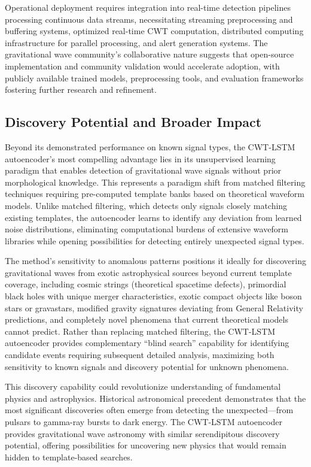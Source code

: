 \documentclass{iopjournal}
\begin{document}
Operational deployment requires integration into real-time detection pipelines processing continuous data streams, necessitating streaming preprocessing and buffering systems, optimized real-time CWT computation, distributed computing infrastructure for parallel processing, and alert generation systems. The gravitational wave community's collaborative nature suggests that open-source implementation and community validation would accelerate adoption, with publicly available trained models, preprocessing tools, and evaluation frameworks fostering further research and refinement.

\subsection{Discovery Potential and Broader Impact}

Beyond its demonstrated performance on known signal types, the CWT-LSTM autoencoder's most compelling advantage lies in its unsupervised learning paradigm that enables detection of gravitational wave signals without prior morphological knowledge. This represents a paradigm shift from matched filtering techniques requiring pre-computed template banks based on theoretical waveform models. Unlike matched filtering, which detects only signals closely matching existing templates, the autoencoder learns to identify any deviation from learned noise distributions, eliminating computational burdens of extensive waveform libraries while opening possibilities for detecting entirely unexpected signal types.

The method's sensitivity to anomalous patterns positions it ideally for discovering gravitational waves from exotic astrophysical sources beyond current template coverage, including cosmic strings (theoretical spacetime defects), primordial black holes with unique merger characteristics, exotic compact objects like boson stars or gravastars, modified gravity signatures deviating from General Relativity predictions, and completely novel phenomena that current theoretical models cannot predict. Rather than replacing matched filtering, the CWT-LSTM autoencoder provides complementary ``blind search'' capability for identifying candidate events requiring subsequent detailed analysis, maximizing both sensitivity to known signals and discovery potential for unknown phenomena.

This discovery capability could revolutionize understanding of fundamental physics and astrophysics. Historical astronomical precedent demonstrates that the most significant discoveries often emerge from detecting the unexpected—from pulsars to gamma-ray bursts to dark energy. The CWT-LSTM autoencoder provides gravitational wave astronomy with similar serendipitous discovery potential, offering possibilities for uncovering new physics that would remain hidden to template-based searches.
\end{document}
